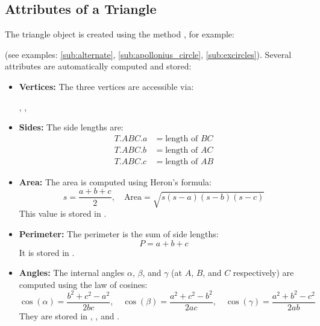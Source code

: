 \subsection{Attributes of a Triangle} %
\label{sub:attributes_of_a_triangle}

The triangle object is created using the method , for example:

\begin{center}
\end{center}

(see examples: \ref{sub:alternate}, \ref{sub:apollonius_circle}, \ref{sub:excircles}). Several attributes are automatically computed and stored:

\begin{itemize}
  \item \textbf{Vertices:} The three vertices are accessible via:
  \begin{center}
    , , 
  \end{center}

  \item \textbf{Sides:} The side lengths are:
  \begin{align*}
    T.ABC.a &= \text{length of } BC \\
    T.ABC.b &= \text{length of } AC \\
    T.ABC.c &= \text{length of } AB
  \end{align*}

  \item \textbf{Area:} The area is computed using Heron’s formula:
  \[
    s = \frac{a + b + c}{2}, \quad \text{Area} = \sqrt{s(s - a)(s - b)(s - c)}
  \]
  This value is stored in .

  \item \textbf{Perimeter:} The perimeter is the sum of side lengths:
  \[
    P = a + b + c
  \]
  It is stored in .

  \item \textbf{Angles:} The internal angles $\alpha$, $\beta$, and $\gamma$ (at $A$, $B$, and $C$ respectively) are computed using the law of cosines:
  \[
  \cos(\alpha) = \frac{b^2 + c^2 - a^2}{2bc}, \quad
  \cos(\beta) = \frac{a^2 + c^2 - b^2}{2ac}, \quad
  \cos(\gamma) = \frac{a^2 + b^2 - c^2}{2ab}
  \]
  They are stored in , , and .
\end{itemize}

